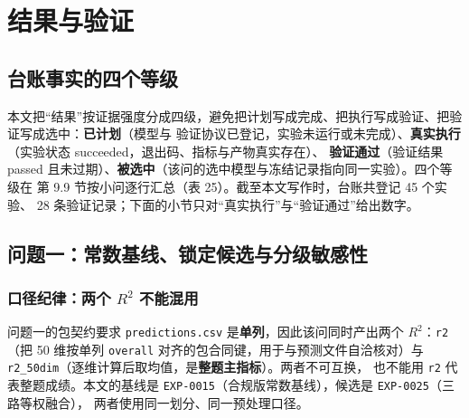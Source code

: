 \documentclass[
  a4paper,12pt]{article}
\begin{document}
\section{结果与验证}\label{ux7ed3ux679cux4e0eux9a8cux8bc1}

\subsection{台账事实的四个等级}\label{ux53f0ux8d26ux4e8bux5b9eux7684ux56dbux4e2aux7b49ux7ea7}

本文把``结果''按证据强度分成四级，避免把计划写成完成、把执行写成验证、把验证写成选中：\textbf{已计划}（模型与
验证协议已登记，实验未运行或未完成）、\textbf{真实执行}（实验状态
succeeded，退出码、指标与产物真实存在）、 \textbf{验证通过}（验证结果
passed
且未过期）、\textbf{被选中}（该问的选中模型与冻结记录指向同一实验）。四个等级在
第 9.9 节按小问逐行汇总（表 25）。截至本文写作时，台账共登记 45 个实验、
28 条验证记录；下面的小节只对``真实执行''与``验证通过''给出数字。

\subsection{问题一：常数基线、锁定候选与分级敏感性}\label{ux95eeux9898ux4e00ux5e38ux6570ux57faux7ebfux9501ux5b9aux5019ux9009ux4e0eux5206ux7ea7ux654fux611fux6027}

\subsubsection{\texorpdfstring{口径纪律：两个 \(R^2\)
不能混用}{口径纪律：两个 R\^{}2 不能混用}}\label{ux53e3ux5f84ux7eaaux5f8bux4e24ux4e2a-r2-ux4e0dux80fdux6df7ux7528}

问题一的包契约要求 \texttt{predictions.csv}
是\textbf{单列}，因此该问同时产出两个 \(R^2\)：\texttt{r2}（把 50
维按单列 \texttt{overall} 对齐的包合同键，用于与预测文件自洽核对）与
\texttt{r2\_50dim}（逐维计算后取均值，是\textbf{整题主指标}）。两者不可互换，
也不能用 \texttt{r2} 代表整题成绩。本文的基线是
\texttt{EXP-0015}（合规版常数基线），候选是
\texttt{EXP-0025}（三路等权融合）， 两者使用同一划分、同一预处理口径。
\end{document}
